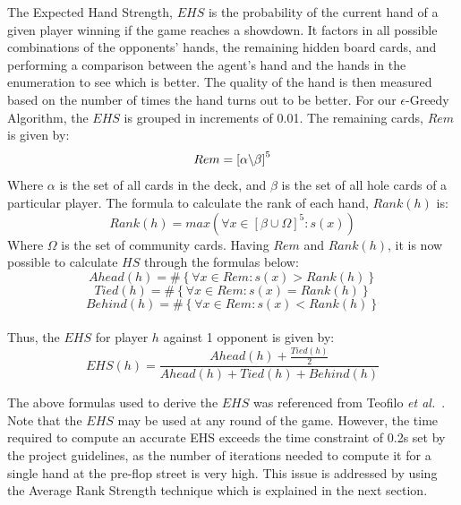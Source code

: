 \documentclass{article}
\begin{document}
The Expected Hand Strength, $EHS$ is the probability of the current hand of a given player winning if the game reaches a showdown. It factors in all possible combinations of the opponents' hands, the remaining hidden board cards, and performing a comparison between the agent's hand and the hands in the enumeration to see which is better. The quality of the hand is then measured based on the number of times the hand turns out to be better. For our $\epsilon$-Greedy Algorithm, the $EHS$ is grouped in increments of 0.01. The remaining cards, $Rem$ is given by:
\begin{displaymath}
  Rem = \left[ \alpha \char`\\ \beta \right]^{5}
\end{displaymath}
Where $\alpha$ is the set of all cards in the deck, and $\beta$ is the set of all hole cards of a particular player. The formula to calculate the rank of each hand, $Rank(h)$ is:
\begin{displaymath}
  Rank(h) = max({\forall x \in [\beta \cup \Omega]^{5} : s(x)})
\end{displaymath}
Where $\Omega$ is the set of community cards.
Having $Rem$ and $Rank(h)$, it is now possible to calculate $HS$ through the formulas below:
\begin{displaymath}
  Ahead(h) = \# \left\lbrace \forall x \in Rem:s(x) > Rank(h) \right\rbrace
\end{displaymath}
\begin{displaymath}
  Tied(h) = \# \left\lbrace \forall x \in Rem:s(x) = Rank(h) \right\rbrace
\end{displaymath}
\begin{displaymath}
  Behind(h) = \# \left\lbrace \forall x \in Rem:s(x) < Rank(h) \right\rbrace
\end{displaymath}\\
Thus, the $EHS$ for player $h$ against 1 opponent is given by:
\begin{displaymath}
  EHS(h)= \frac{Ahead(h)+\frac{Tied(h)}{2}}{Ahead(h) + Tied(h) + Behind(h)}
\end{displaymath}

\noindent The above formulas used to derive the $EHS$ was referenced from Teofilo \textit{et al.}~. Note that the $EHS$ may be used at any round of the game. However, the time required to compute an accurate EHS exceeds the time constraint of 0.2s set by the project guidelines, as the number of iterations needed to compute it for a single hand at the pre-flop street is very high. This issue is addressed by using the Average Rank Strength technique which is explained in the next section.
\end{document}

